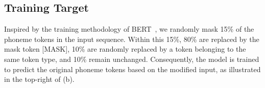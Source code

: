 \subsection{Training Target}
Inspired by the training methodology of BERT~\cite{devlin2018bert}, we randomly mask 15\% of the phoneme tokens in the input sequence. Within this 15\%, 80\% are replaced by the mask token [MASK], 10\% are randomly replaced by a token belonging to the same token type, and 10\% remain unchanged. Consequently, the model is trained to predict the original phoneme tokens based on the modified input, as illustrated in the top-right of (b).

